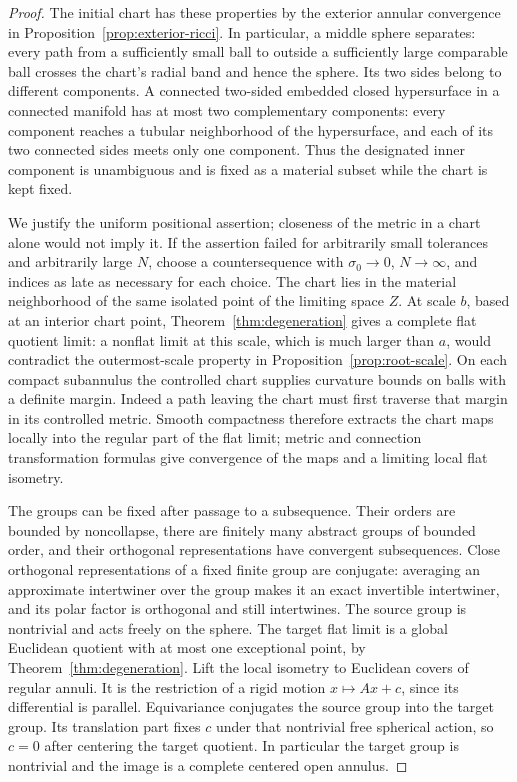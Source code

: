 \begin{proof}
The initial chart has these properties by the exterior annular
convergence in Proposition~\ref{prop:exterior-ricci}.  In particular,
a middle sphere separates: every path from a sufficiently small ball
to outside a sufficiently large comparable ball crosses the chart's
radial band and hence the sphere.  Its two sides belong to different
components.  A connected two-sided embedded closed hypersurface in a
connected manifold has at most two complementary components: every
component reaches a tubular neighborhood of the hypersurface, and
each of its two connected sides meets only one component.  Thus the
designated inner component is unambiguous and is fixed as a material
subset while the chart is kept fixed.

We justify the uniform positional assertion; closeness of the metric
in a chart alone would not imply it.  If the assertion failed for
arbitrarily small tolerances and arbitrarily large $N$, choose a
countersequence with $\sigma_0\to0$, $N\to\infty$, and indices as late
as necessary for each choice.  The chart lies in the material
neighborhood of the same isolated point of the limiting space $Z$.
At scale $b$, based at an interior chart point, Theorem~\ref{thm:degeneration}
gives a complete flat quotient limit: a nonflat limit at this scale,
which is much larger than $a$, would contradict the outermost-scale
property in Proposition~\ref{prop:root-scale}.  On each compact
subannulus the controlled chart supplies curvature bounds on balls
with a definite margin.  Indeed a path leaving the chart must first
traverse that margin in its controlled metric.  Smooth compactness
therefore extracts the chart maps locally into the regular part of
the flat limit; metric and connection transformation formulas give
convergence of the maps and a limiting local flat isometry.

The groups can be fixed after passage to a subsequence.  Their orders
are bounded by noncollapse, there are finitely many abstract groups
of bounded order, and their orthogonal representations have convergent
subsequences.  Close orthogonal representations of a fixed finite
group are conjugate: averaging an approximate intertwiner over the
group makes it an exact invertible intertwiner, and its polar factor
is orthogonal and still intertwines.  The source group is nontrivial
and acts freely on the sphere.  The target flat limit is a global
Euclidean quotient with at most one exceptional point, by
Theorem~\ref{thm:degeneration}.  Lift the local isometry to Euclidean
covers of regular annuli.  It is the restriction of a rigid motion
$x\mapsto Ax+c$, since its differential is parallel.  Equivariance
conjugates the source group into the target group.  Its translation
part fixes $c$ under that nontrivial free spherical action, so $c=0$
after centering the target quotient.  In particular the target group
is nontrivial and the image is a complete centered open annulus.


\end{proof}
